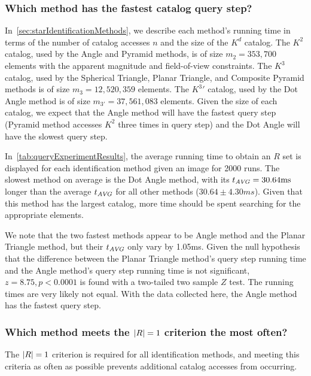 \subsubsection{Which method has the fastest catalog query step?}
In~\autoref{sec:starIdentificationMethods}, we describe each method's running time in terms of the number of catalog
accesses $n$ and the size of the $K^d$ catalog.
The $K^2$ catalog, used by the Angle and Pyramid methods, is of size $m_2 = 353,700$ elements with the apparent
magnitude and field-of-view constraints.
The $K^3$ catalog, used by the Spherical Triangle, Planar Triangle, and Composite Pyramid methods is of size
$m_3 = 12,520,359$ elements.
The $K^3'$ catalog, used by the Dot Angle method is of size $m_{3'} = 37,561,083$ elements.
Given the size of each catalog, we expect that the Angle method will have the fastest query step
(Pyramid method accesses $K^2$ three times in query step) and the Dot Angle will have the slowest query step.

In~\autoref{tab:queryExperimentResults}, the average running time to obtain an $R$ set is displayed for each
identification method given an image for 2000 runs.
The slowest method on average is the Dot Angle method, with its $t_{\AVG} = 30.64 \si{ms}$ longer than the average
$t_{\AVG}$ for all other methods ($30.64 \pm 4.30 \si{ms}$).
Given that this method has the largest catalog, more time should be spent searching for the appropriate elements.

We note that the two fastest methods appear to be Angle method and the Planar Triangle method, but their $t_\AVG$ only
vary by 1.05ms.
Given the null hypothesis that the difference between the Planar Triangle method's query step running time and the
Angle method's query step running time is not significant, $z = 8.75, p < 0.0001$ is found with a two-tailed two
sample $Z$ test.
The running times are very likely not equal.
With the data collected here, the Angle method has the fastest query step.

\subsubsection{Which method meets the $\abs{R} = 1$ criterion the most often?}
The $\abs{R} = 1$ criterion is required for all identification methods, and meeting this criteria as often as possible
prevents additional catalog accesses from occurring.

